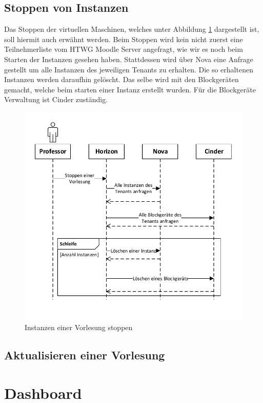 \subsection{Stoppen von Instanzen}
Das Stoppen der virtuellen Maschinen, welches unter Abbildung \ref{stopInstances} dargestellt ist,
soll hiermit auch erwähnt werden.
Beim Stoppen wird kein nicht zuerst eine Teilnehmerliste vom HTWG Moodle Server angefragt, wie
wir es noch beim Starten der Instanzen gesehen haben. Stattdessen wird über Nova eine Anfrage
gestellt um alle Instanzen des jeweiligen Tenants zu erhalten. Die so erhaltenen Instanzen werden
daraufhin gelöscht. Das selbe wird mit den Blockgeräten gemacht, welche beim starten einer
Instanz erstellt wurden. Für die Blockgeräte Verwaltung ist Cinder zuständig.

\begin{figure}[H]
	\centering
	\includegraphics[scale=0.6]{img/stopInstances.pdf}
\caption{Instanzen einer Vorlesung stoppen}
\label{stopInstances}
\FloatBarrier
\end{figure}

\subsection{Aktualisieren einer Vorlesung}


\section{Dashboard}

